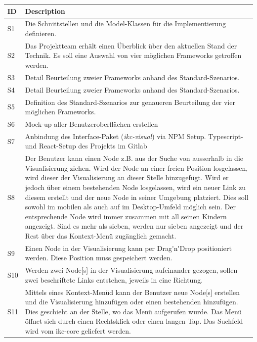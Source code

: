 \begin{longtable}{|p{1cm} | p{10.8cm} |}
\hline
ID  & Description\\ \hline
S1  & Die Schnittstellen und die Model-Klassen für die Implementierung definieren.     \\ \hline
S2  & Das Projektteam erhält einen Überblick über den aktuellen Stand der Technik. Es soll eine Auswahl von vier möglichen Frameworks getroffen werden.\\ \hline
S3  & Detail Beurteilung zweier Frameworks anhand des Standard-Szenarios.\\ \hline
S4  & Detail Beurteilung zweier Frameworks anhand des Standard-Szenarios. \\ \hline
S5  & Definition des Standard-Szenarios zur genaueren Beurteilung der vier möglichen Frameworks. \\ \hline
S6  & Mock-up aller Benutzeroberflächen erstellen \\ \hline
S7  & Anbindung des Interface-Paket (\textit{ikc-visual}) via NPM Setup. Typescript- und React-Setup des Projekts im Gitlab \\ \hline
S8  & Der Benutzer kann einen \gls{Node} z.B. aus der Suche von ausserhalb in die Visualisierung ziehen. Wird der \gls{Node} an einer freien Position losgelassen, wird dieser der Visualisierung an dieser Stelle hinzugefügt. Wird er jedoch über einem bestehenden \gls{Node} losgelassen, wird ein neuer Link zu diesem erstellt und der neue \gls{Node} in seiner Umgebung platziert. Dies soll sowohl im mobilen als auch auf im Desktop-Umfeld möglich sein. Der entsprechende \gls{Node} wird immer zusammen mit all seinen Kindern angezeigt. Sind es mehr als sieben, werden nur sieben angezeigt und der Rest über das Kontext-Menü zugänglich gemacht.\\ \hline
S9  & Einen \gls{Node} in der Visualisierung kann per \gls{Drag'n'Drop} positioniert werden. Diese Position muss gespeichert werden.    \\ \hline
S10 & Werden zwei \gls{Node}[s] in der Visualisierung aufeinander gezogen, sollen zwei beschriftete Links entstehen, jeweils in eine Richtung.       \\ \hline
S11 & Mittels eines Kontext-Menüd kann der Benutzer neue \gls{Node}[s] erstellen und die Visualisierung hinzufügen oder einen bestehenden hinzufügen. Dies geschieht an der Stelle, wo das Menü aufgerufen wurde. Das Menü öffnet sich durch einen Rechtsklick oder einen langen Tap. Das Suchfeld wird vom \gls{ikc-core} geliefert werden. \\ \hline

\end{longtable}
